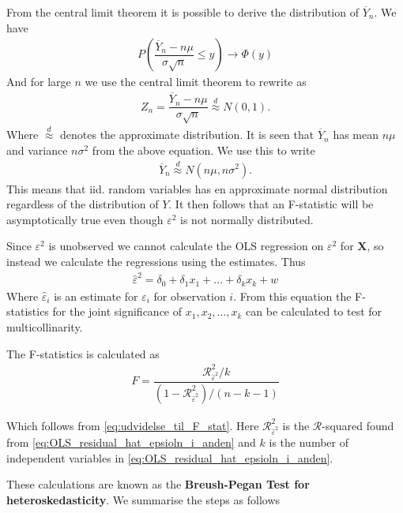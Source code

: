 From the central limit theorem it is possible to derive the distribution of $\overline{Y}_n$. We have  
\begin{align*}
    P\left(\dfrac{\overline{Y}_n - n\mu}{\sigma \sqrt{n}} \leq y\right) \rightarrow \Phi(y)
\end{align*}
And for large $n$ we use the central limit theorem to rewrite as
\begin{align*}
    Z_n = \dfrac{\overline{Y}_n - n\mu}{\sigma \sqrt{n}} \stackrel{d}{\approx} N(0,1). 
\end{align*}
Where $\stackrel{d}{\approx}$ denotes the approximate distribution. It is seen that $\overline{Y}_n$ has mean $n\mu$ and variance $n \sigma^2$ from the above equation. We use this to write
\begin{align*}
    \overline{Y}_n \stackrel{d}{\approx} N(n\mu, n\sigma^2). 
\end{align*}
This means that iid. random variables has en approximate normal distribution regardless of the distribution of $Y$. It then follows that an F-statistic will be asymptotically true even though $\varepsilon^2$ is not normally distributed. 

Since $\varepsilon^2$ is unobserved we cannot calculate the OLS regression on $\varepsilon^2$ for $\mathbf{X}$, so instead we calculate the regressions using the estimates. Thus
\begin{align}\label{eq:OLS_residual_hat_epsioln_i_anden}
    \hat{\varepsilon}^2 = \delta_0 + \delta_1x_1 + \ldots + \delta_kx_k + w
\end{align}
Where $\hat{\varepsilon}_i$ is an estimate for $\varepsilon_i$ for observation $i$. From this equation the F-statistics for the joint significance of $x_1, x_2, \ldots, x_k$ can be calculated to test for multicollinarity. 

The F-statistics is calculated as
\begin{align*}
    F = \dfrac{\mathcal{R}^2_{\hat{\varepsilon}^2}/k}{(1-\mathcal{R}^2_{\hat{\varepsilon}^2}) / (n-k-1)}
\end{align*}

Which follows from \eqref{eq:udvidelse_til_F_stat}. Here $\mathcal{R}^2_{\hat{\varepsilon}^2}$ is the $\mathcal{R}$-squared found from \eqref{eq:OLS_residual_hat_epsioln_i_anden} and $k$ is the number of independent variables in \eqref{eq:OLS_residual_hat_epsioln_i_anden}. 

These calculations are known as the \textbf{Breush-Pegan Test for heteroskedasticity}. We summarise the steps as follows

